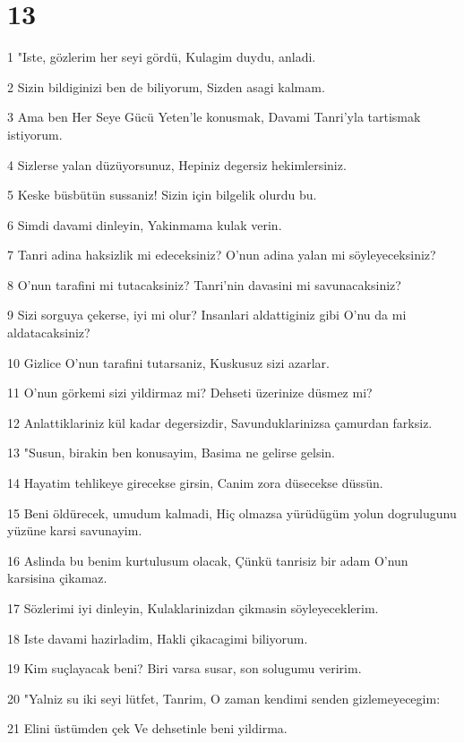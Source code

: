 \chapter{13}

\par 1 "Iste, gözlerim her seyi gördü, Kulagim duydu, anladi.
\par 2 Sizin bildiginizi ben de biliyorum, Sizden asagi kalmam.
\par 3 Ama ben Her Seye Gücü Yeten'le konusmak, Davami Tanri'yla tartismak istiyorum.
\par 4 Sizlerse yalan düzüyorsunuz, Hepiniz degersiz hekimlersiniz.
\par 5 Keske büsbütün sussaniz! Sizin için bilgelik olurdu bu.
\par 6 Simdi davami dinleyin, Yakinmama kulak verin.
\par 7 Tanri adina haksizlik mi edeceksiniz? O'nun adina yalan mi söyleyeceksiniz?
\par 8 O'nun tarafini mi tutacaksiniz? Tanri'nin davasini mi savunacaksiniz?
\par 9 Sizi sorguya çekerse, iyi mi olur? Insanlari aldattiginiz gibi O'nu da mi aldatacaksiniz?
\par 10 Gizlice O'nun tarafini tutarsaniz, Kuskusuz sizi azarlar.
\par 11 O'nun görkemi sizi yildirmaz mi? Dehseti üzerinize düsmez mi?
\par 12 Anlattiklariniz kül kadar degersizdir, Savunduklarinizsa çamurdan farksiz.
\par 13 "Susun, birakin ben konusayim, Basima ne gelirse gelsin.
\par 14 Hayatim tehlikeye girecekse girsin, Canim zora düsecekse düssün.
\par 15 Beni öldürecek, umudum kalmadi, Hiç olmazsa yürüdügüm yolun dogrulugunu yüzüne karsi savunayim.
\par 16 Aslinda bu benim kurtulusum olacak, Çünkü tanrisiz bir adam O'nun karsisina çikamaz.
\par 17 Sözlerimi iyi dinleyin, Kulaklarinizdan çikmasin söyleyeceklerim.
\par 18 Iste davami hazirladim, Hakli çikacagimi biliyorum.
\par 19 Kim suçlayacak beni? Biri varsa susar, son solugumu veririm.
\par 20 "Yalniz su iki seyi lütfet, Tanrim, O zaman kendimi senden gizlemeyecegim:
\par 21 Elini üstümden çek Ve dehsetinle beni yildirma.
